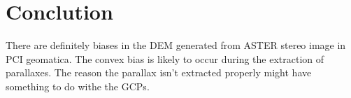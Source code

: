 \documentclass[a4paper,UKenglish]{article}
\begin{document}
\section{Conclution}

There are definitely biases in the DEM generated from ASTER stereo image in PCI geomatica. The convex bias is likely to occur during the extraction of parallaxes. The reason the parallax isn't extracted properly might have something to do withe the GCPs.



\end{document}
